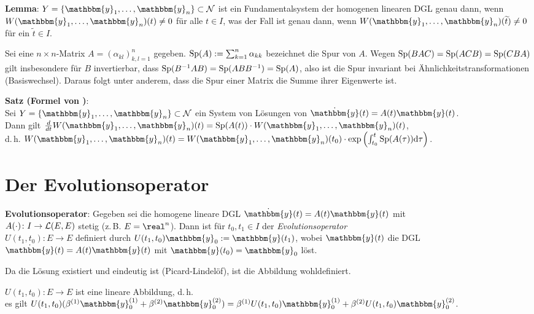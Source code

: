\linie

\textbf{Lemma}:
$Y = \{\mathbbm{y}_1, \dotsc, \mathbbm{y}_n\} \subset \mathcal{N}$
ist ein Fundamentalsystem der homogenen linearen DGL  genau
dann, wenn $W(\mathbbm{y}_1, \dotsc, \mathbbm{y}_n)(t) \not= 0$ für alle
$t \in I$, was der Fall ist genau dann, wenn
$W(\mathbbm{y}_1, \dotsc, \mathbbm{y}_n)(\widetilde{t}) \not= 0$ für ein
$\widetilde{t} \in I$.

Sei eine $n \times n$-Matrix $A = (\alpha_{kl})_{k,l=1}^n$ gegeben.
$\operatorname{Sp}(A) := \sum_{k=1}^n \alpha_{kk}$ bezeichnet die Spur von $A$.
Wegen $\operatorname{Sp}(BAC) = \operatorname{Sp}(ACB) = \operatorname{Sp}(CBA)$ gilt insbesondere für $B$ invertierbar,
dass $\operatorname{Sp}(B^{-1} A B) = \operatorname{Sp}(A B B^{-1}) = \operatorname{Sp}(A)$, also ist die Spur invariant
bei Ähnlichkeitstransformationen (Basiswechsel).
Daraus folgt unter anderem, dass die Spur einer Matrix die Summe ihrer
Eigenwerte ist.

\textbf{Satz (Formel von )}: \\
Sei $Y = \{\mathbbm{y}_1, \dotsc, \mathbbm{y}_n\} \subset \mathcal{N}$
ein System von Lösungen von $\dot{\mathbbm{y}}(t) = A(t) \mathbbm{y}(t)$. \\
Dann gilt $\frac{d}{dt} W(\mathbbm{y}_1, \dotsc, \mathbbm{y}_n)(t) =
\Sp(A(t)) \cdot W(\mathbbm{y}_1, \dotsc, \mathbbm{y}_n)(t)$, \\
d.\,h. $W(\mathbbm{y}_1, \dotsc, \mathbbm{y}_n)(t) =
W(\mathbbm{y}_1, \dotsc, \mathbbm{y}_n)(t_0) \cdot
\exp\left(\int_{t_0}^t \Sp(A(\tau))\d\tau\right)$.

\pagebreak

\section{%
    Der Evolutionsoperator%
}

\textbf{Evolutionsoperator}:
Gegeben sei die homogene lineare DGL
$\dot{\mathbbm{y}}(t) = A(t) \mathbbm{y}(t)$ mit \\
$A(\cdot)\colon I \rightarrow \mathcal{L}(E, E)$ stetig (z.\,B. $E = \real^n$).
Dann ist für $t_0, t_1 \in I$ der \emph{Evolutionsoperator} \\
$U(t_1, t_0)\colon E \rightarrow E$ definiert durch
$U(t_1, t_0) \mathbbm{y}_0 := \mathbbm{y}(t_1)$, wobei $\mathbbm{y}(t)$ die DGL
$\dot{\mathbbm{y}}(t) = A(t) \mathbbm{y}(t)$ mit
$\mathbbm{y}(t_0) = \mathbbm{y}_0$ löst.

Da die Lösung existiert und eindeutig ist (Picard-Lindelöf),
ist die Abbildung wohldefiniert.

$U(t_1, t_0)\colon E \rightarrow E$ ist eine lineare Abbildung, d.\,h. \\
es gilt $U(t_1, t_0)(\beta^{(1)} \mathbbm{y}_0^{(1)} +
\beta^{(2)} \mathbbm{y}_0^{(2)}) =
\beta^{(1)} U(t_1, t_0) \mathbbm{y}_0^{(1)} +
\beta^{(2)} U(t_1, t_0) \mathbbm{y}_0^{(2)}$.

